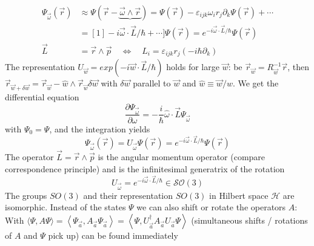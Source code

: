 \begin{equation}
\begin{aligned} \Psi_{\vec{\omega}}(\vec{r}) & \approx \Psi(\vec{r}-\underbrace{\vec{\omega} \wedge \vec{r}})=\Psi(\vec{r})-\varepsilon_{i j k} \omega_{i} r_{j} \partial_{k} \Psi(\vec{r})+\cdots \\ &=[1]-i \vec{\omega} \cdot \vec{L} / \hbar+\cdots] \Psi(\vec{r})=e^{-i \vec{\omega} \cdot \vec{L} / \hbar} \Psi(\vec{r}) \\ \vec{L} &=\vec{r} \wedge \vec{p} \quad \Leftrightarrow \quad L_{i}=\varepsilon_{i j k} r_{j}\left(-i \hbar \partial_{k}\right) \end{aligned}
\end{equation}
The representation $U_{\vec{w}}=exp(-i\vec{w}\cdot\vec{L}/\hbar)$ holds for large $\vec{w}$: be $\vec{r}_{\vec{w}}=R^{-1}_{\vec{w}}\vec{r}$, then $\vec{r}_{\vec{w}+\delta\vec{w}}=\vec{r}_{\vec{w}}-\hat{w}\wedge\vec{r}_{\vec{w}}\delta\vec{w}$ with $\delta\vec{w}$ parallel to $\vec{w}$ and $ \hat{w} \equiv \vec{w} / w$. We get the differential equation
\begin{equation}
    \frac{\partial \Psi_{\vec{\omega}}}{\partial \omega}=-\frac{i}{\hbar} \hat{\omega} \cdot \vec{L} \Psi_{\vec{\omega}}
    \end{equation}
with $\Psi_0=\Psi$, and the integration yields
\begin{equation}
    \Psi_{\vec{\omega}}(\vec{r})=U_{\vec{\omega}} \Psi(\vec{r})=e^{-i \vec{\omega} \cdot \vec{L} / \hbar} \Psi(\vec{r})
    \end{equation}
The operator $\vec{L}=\vec{r}\wedge\vec{p}$ is the angular momentum operator (compare correspondence principle) and is the infinitesimal generatrix of the rotation
\begin{equation}
    U_{\vec{\omega}}=e^{-i \vec{\omega} \cdot \vec{L} / \hbar} \in \mathcal{S O}(3)
    \end{equation}
The groups $SO (3)$ and their representation $SO (3)$ in Hilbert space $\mathcal{H}$ are isomorphic.
Instead of the states $\Psi$ we can also shift or rotate the operators $A$: With $\langle\Psi, A \Psi\rangle=\left\langle\Psi_{\vec{a}}, A_{\vec{a}} \Psi_{\vec{a}}\right\rangle=\left\langle\Psi, U_{\vec{a}}^{\dagger} A_{\vec{a}} U_{\vec{a}} \Psi\right\rangle$ (simultaneous shifts / rotations of $A$ and $\Psi$ pick up) can be found immediately

